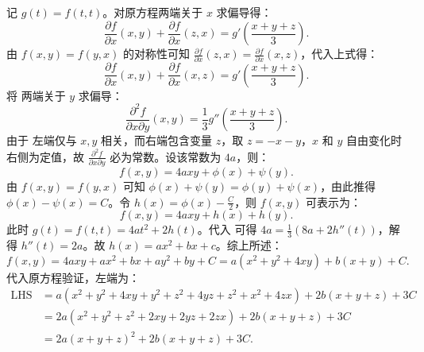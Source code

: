 \begin{solution}

    记 $g(t) = f(t,t)$。对原方程两端关于 $x$ 求偏导得：
    \begin{equation}
        \frac{\partial f}{\partial x}(x,y) + \frac{\partial f}{\partial x}(z,x) = g'\left( \frac{x+y+z}{3} \right).
    \end{equation}
    由 $f(x,y) = f(y,x)$ 的对称性可知 $\frac{\partial f}{\partial x}(z,x) = \frac{\partial f}{\partial x}(x,z)$，代入上式得：
    \begin{equation}
        \frac{\partial f}{\partial x}(x,y) + \frac{\partial f}{\partial x}(x,z) = g'\left( \frac{x+y+z}{3} \right). \label{eq:partial-x-1}
    \end{equation}
    将  两端关于 $y$ 求偏导：
    \begin{equation}
        \frac{\partial^2 f}{\partial x \partial y}(x,y) = \frac{1}{3} g''\left( \frac{x+y+z}{3} \right). \label{eq:second-partial-1}
    \end{equation}
    由于  左端仅与 $x,y$ 相关，而右端包含变量 $z$，取 $z = -x-y$，$x$ 和 $y$ 自由变化时右侧为定值，故 $\frac{\partial^2 f}{\partial x \partial y}$ 必为常数。设该常数为 $4a$，则：
    \begin{equation}
        f(x,y) = 4axy + \phi(x) + \psi(y).
    \end{equation}
    由 $f(x,y) = f(y,x)$ 可知 $\phi(x) + \psi(y) = \phi(y) + \psi(x)$，由此推得 $\phi(x) - \psi(x) = C$。令 $h(x) = \phi(x) - \frac{C}{2}$，则 $f(x,y)$ 可表示为：
    \begin{equation}
        f(x,y) = 4axy + h(x) + h(y).
    \end{equation}
    此时 $g(t) = f(t,t) = 4at^2 + 2h(t)$。代入  可得 $4a = \frac{1}{3}(8a + 2h''(t))$，解得 $h''(t) = 2a$。故 $h(x) = ax^2 + bx + c$。综上所述：
    \begin{equation}
        f(x,y) = 4axy + ax^2 + bx + ay^2 + by + C = a(x^2 + y^2 + 4xy) + b(x+y) + C.
    \end{equation}
    代入原方程验证，左端为：
    \begin{equation}
        \begin{aligned}
            \text{LHS} & = a(x^2+y^2+4xy + y^2+z^2+4yz + z^2+x^2+4zx) + 2b(x+y+z) + 3C \\
                       & = 2a(x^2+y^2+z^2 + 2xy + 2yz + 2zx) + 2b(x+y+z) + 3C          \\
                       & = 2a(x+y+z)^2 + 2b(x+y+z) + 3C.

\end{aligned}
\end{equation}
\end{solution}
